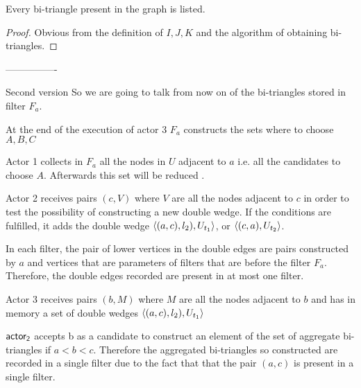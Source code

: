 \begin{theorem}\label{TH-all}Every bi-triangle present in the graph is listed.

\end{theorem}

\begin{proof}

Obvious  from the definition of $I,J,K$  and the algorithm of obtaining bi-triangles. 
\iffalse
Lets assume that a bi-triangle $(a,A,b,B,c,C)$   will assume that $a$ is the smallest element in the set $\{a,b,c\}$ and $c$ is the bigger.
When actor 1 in fiter $F_a$1 ends reading all the edges, $\{A,B\} \subseteq W_a$. Also When actor 1 in fiter $F_c$1 ends reading all the edges, $\{B,C\} \subseteq W_c$. 

AS $a < c$  in filter $F_a$ the pair $(a,c)$  will be added to D
$DW$. When actor 3 in filter $F_a$ receives $(b, W_b)$ will add to $BT$ because of the non empty intersection. Therefore the bi-triangle $(a,A,b,B,c,C)$ can be recognized
\fi
\end{proof}

----------------

Second version
 So we are going to talk from now on of the bi-triangles stored in  filter $F_a$.

 At the end of the execution of actor 3 $F_a$ constructs the sets where to choose $A,B,C$
 
 Actor 1 collects in $F_a$ all the nodes in $U$ adjacent to $a$ i.e. all the candidates to choose $A$. Afterwards this set will be reduced . 
 
 Actor 2 receives pairs $(c,V)$ where $V$ are all the nodes adjacent to $c$ in order to test the possibility of constructing a new double wedge.  If the conditions are fulfilled, it adds the double wedge $\left\langle (a,c), l_2), U_{t_1} \right\rangle$,  or $\left\langle (c, a), U_{t_2} \right\rangle$. 
 
 In each filter, the pair of lower vertices in the double edges are pairs constructed by $a$ and vertices that are parameters of filters that are before the filter $F_a$. Therefore, the double edges recorded are present in at most one filter.
 
 Actor 3 receives pairs $(b,M) $ where $M$ are all the nodes adjacent to $b$ and has in memory a set of double wedges $\left\langle (a,c), l_2), U_{t_1} \right\rangle$
 
 $\mathsf{actor_2}$ accepts b as a candidate to construct an element of the set of aggregate bi-triangles if $a < b < c$. Therefore the aggregated bi-triangles so constructed are recorded in a single filter due to the fact that that the pair $(a,c)$ is present in a single filter.
 
